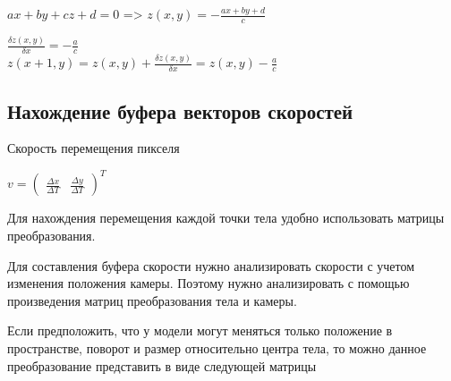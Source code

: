 $ax + by + cz + d = 0$ => $z(x,y) = -\frac{ax + by + d}{c}$

$\frac{\delta z(x,y)}{\delta x} = -\frac{a}{c}$\\

$z(x + 1,y) = z(x, y)  + \frac{\delta z(x,y)}{\delta x} = 
z(x,y)  -\frac{a}{c}$




\subsection{Нахождение буфера векторов скоростей}

Скорость перемещения пикселя 

$v = \begin{pmatrix}
\frac{\Delta x}{\Delta T} &
\frac{\Delta y}{\Delta T} 
\end{pmatrix}^T$

Для нахождения перемещения каждой точки тела удобно использовать матрицы преобразования.

Для составления буфера скорости нужно анализировать скорости с учетом изменения положения камеры. Поэтому нужно анализировать с помощью произведения матриц преобразования тела и камеры.

Если предположить, что у модели могут меняться только положение в пространстве, поворот и размер относительно центра тела, то можно данное преобразование представить в виде следующей матрицы


